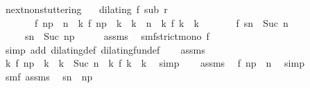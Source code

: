 \begin{isabellebody}
\isamarkupfalse%
%
\endisatagproof
{\isafoldproof}%
%
\isadelimproof
\isanewline
%
\endisadelimproof
\isanewline
{}\isamarkupfalse%
\ next{\isacharunderscore}non{\isacharunderscore}stuttering{\isacharcolon}\isanewline
\ \ \ {\isacartoucheopen}dilating\ f\ sub\ r{\isacartoucheclose}\isanewline
\ \ \ \ \ \ \ {\isacartoucheopen}f\ n\isactrlsub p\ {\isacharless}\ n\ {\isasymand}\ {\isacharparenleft}{\isasymforall}k{\isachardot}\ f\ n\isactrlsub p\ {\isacharless}\ k\ {\isasymand}\ k\ {\isasymle}\ n\ {\isasymlongrightarrow}\ {\isacharparenleft}{\isasymnexists}k\ f\ k\ {\isacharequal}\ k{\isacharparenright}{\isacharparenright}{\isacartoucheclose}\isanewline
\ \ \ \ \ \ \ {\isacartoucheopen}f\ sn\ {\isacharequal}\ Suc\ n{\isacartoucheclose}\isanewline
\ \ \ \ \ {\isacartoucheopen}sn\ {\isacharequal}\ Suc\ n\isactrlsub p{\isacartoucheclose}\isanewline
%
\isadelimproof
%
\endisadelimproof
%
\isatagproof
{}\isamarkupfalse%
\ {\isacharminus}\isanewline
\ \ \isamarkupfalse%
\ assms{\isacharparenleft}{}{\isacharparenright}\ \isamarkupfalse%
\ smf{\isacharcolon}{\isacartoucheopen}strict{\isacharunderscore}mono\ f{\isacartoucheclose}\ \isamarkupfalse%
\ {\isacharparenleft}simp\ add{\isacharcolon}\ dilating{\isacharunderscore}def\ dilating{\isacharunderscore}fun{\isacharunderscore}def{\isacharparenright}\isanewline
\ \ \isamarkupfalse%
\ assms{\isacharparenleft}{}{\isacharparenright}\ \isamarkupfalse%
\ {\isacharasterisk}{\isacharcolon}{\isacartoucheopen}{\isasymforall}k{\isachardot}\ f\ n\isactrlsub p\ {\isacharless}\ k\ {\isasymand}\ k\ {\isacharless}\ Suc\ n\ {\isasymlongrightarrow}\ {\isacharparenleft}{\isasymnexists}k\ f\ k\ {\isacharequal}\ k{\isacharparenright}{\isacartoucheclose}\ \isamarkupfalse%
\ simp\isanewline
\ \ \isamarkupfalse%
\ assms{\isacharparenleft}{}{\isacharparenright}\ \isamarkupfalse%
\ {\isacartoucheopen}f\ n\isactrlsub p\ {\isacharless}\ n{\isacartoucheclose}\ \isamarkupfalse%
\ simp\isanewline
\ \ \isamarkupfalse%
\ smf\ assms{\isacharparenleft}{}{\isacharparenright}\ \isamarkupfalse%
\ {\isacharasterisk}{\isacharasterisk}{\isacharcolon}{\isacartoucheopen}sn\ {\isachargreater}\ n\isactrlsub p{\isacartoucheclose}\ \isamarkupfalse%

\end{isabellebody}
